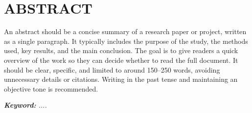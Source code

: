 \documentclass[main]{subfiles}
\begin{document}
\section*{\centering \Large{\textbf{\MakeUppercase{Abstract}} }}
    An abstract should be a concise summary of a research paper or project, written as a single paragraph. It typically includes the purpose of the study, the methods used, key results, and the main conclusion. The goal is to give readers a quick overview of the work so they can decide whether to read the full document. It should be clear, specific, and limited to around 150–250 words, avoiding unnecessary details or citations. Writing in the past tense and maintaining an objective tone is recommended.

\textit{
\newline
\textbf{Keyword:} ....
}
\end{document}
